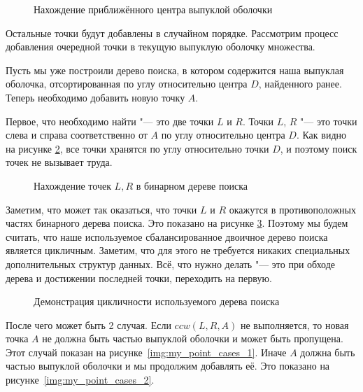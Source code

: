 \begin{figure}[hbt]
	{\centering
		\hfill
		\subbottom[\label{img:my_extreme_points_1}]{%
			}
		\hfill
		\subbottom[\label{img:my_extreme_points_2}]{%
			}
		\hfill
	}
	\caption{Нахождение приближённого центра выпуклой оболочки}
	\label{img:my_extreme_points}
\end{figure}

Остальные точки будут добавлены в случайном порядке. Рассмотрим процесс добавления очередной точки в текущую выпуклую оболочку множества.

Пусть мы уже построили дерево поиска, в котором содержится наша выпуклая оболочка, отсортированная по углу относительно центра $D$, найденного ранее. Теперь необходимо добавить новую точку $A$.

Первое, что необходимо найти "--- это две точки $L$ и $R$. Точки $L$, $R$ "--- это точки слева и справа соответственно от $A$ по углу относительно центра $D$. Как видно на рисунке \ref{img:my_find_lr}, все точки хранятся по углу относительно точки $D$, и поэтому поиск точек не вызывает труда.

\begin{figure}[hbt]
	\centering
	
	\caption{Нахождение точек $L, R$ в бинарном дереве поиска}
	\label{img:my_find_lr}
\end{figure}

Заметим, что может так оказаться, что точки $L$ и $R$ окажутся в противоположных частях бинарного дерева поиска. Это показано на рисунке \ref{img:my_find_cyclic}. Поэтому мы будем считать, что наше используемое сбалансированное двоичное дерево поиска является цикличным. Заметим, что для этого не требуется никаких специальных дополнительных структур данных. Всё, что нужно делать "--- это при обходе дерева и достижении последней точки, переходить на первую.

\begin{figure}[hbt]
	\centering
	
	\caption{Демонстрация цикличности используемого дерева поиска}
	\label{img:my_find_cyclic}
\end{figure}

После чего может быть 2 случая. Если $ccw(L, R, A)$ не выполняется, то новая точка $A$ не должна быть частью выпуклой оболочки и может быть пропущена. Этот случай показан на рисунке~\ref{img:my_point_cases_1}. Иначе $A$ должна быть частью выпуклой оболочки и мы продолжим добавлять её. Это показано на рисунке~\ref{img:my_point_cases_2}.

